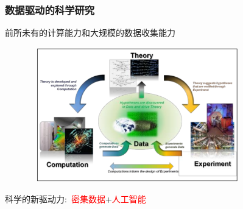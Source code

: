 %
\frame
{
	\frametitle{数据驱动的科学研究}
前所未有的计算能力和大规模的数据收集能力%
\begin{figure}[h!]
\centering
\includegraphics[height=2.30in,width=3.70in]{Figures/Four_Model_1.png}
\label{Four_Model_1}
\end{figure}
科学的新驱动力:~\textcolor{red}{密集数据}+\textcolor{red}{人工智能}\\
}

